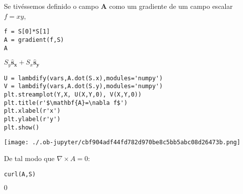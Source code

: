 \documentclass[11pt]{article}
\begin{document}
Se tivéssemos definido o campo \(\mathbf A\) como um gradiente de um campo
escalar \(f=xy\),
\begin{verbatim}
f = S[0]*S[1]
A = gradient(f,S)
A
\end{verbatim}

$\displaystyle S_{y}\mathbf{\hat{s}_x} + S_{x}\mathbf{\hat{s}_y}$

\begin{verbatim}
U = lambdify(vars,A.dot(S.x),modules='numpy')
V = lambdify(vars,A.dot(S.y),modules='numpy')
plt.streamplot(Y,X, U(X,Y,0), V(X,Y,0))
plt.title(r'$\mathbf{A}=\nabla f$')
plt.xlabel(r'x')
plt.ylabel(r'y')
plt.show()
\end{verbatim}

\begin{center}
\texttt{[image: ./.ob-jupyter/cbf904adf44fd782d970be8c5bb5abc08d26473b.png]}
\end{center}
De tal modo que \(\nabla\times A=0\):
\begin{verbatim}
curl(A,S)
\end{verbatim}

$\displaystyle 0$
\end{document}
